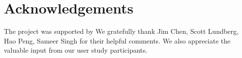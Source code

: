 \section*{Acknowledgements}
The project was supported by 
We gratefully thank Jim Chen, Scott Lundberg, Hao Peng, Sameer Singh for their helpful comments.
We also appreciate the valuable input from our user study participants.